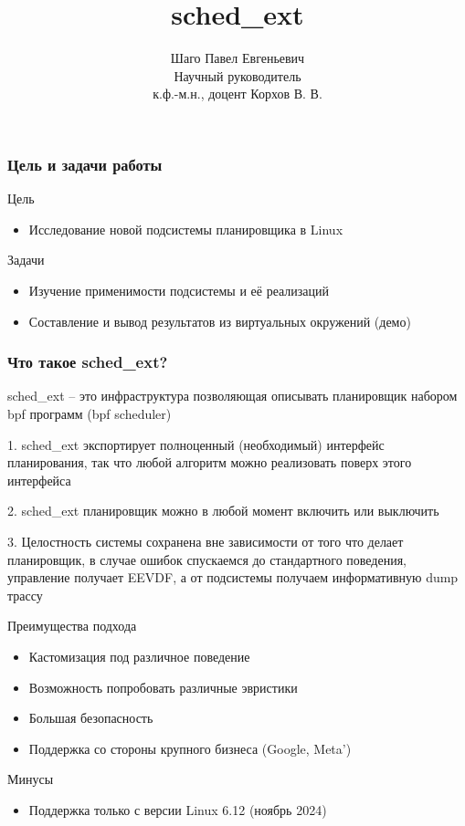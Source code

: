 \documentclass[aspectratio=169]{beamer}
\title{sched\_ext}
\author{Шаго Павел Евгеньевич \\[1\baselineskip] Научный руководитель\\ к.ф.-м.н.,
доцент Корхов В. В.}
\institute{Санкт-Петербургский государственный университет \\ Факультет прикладной математики - процессов управления \\ Кафедра моделирования электромеханических и компьютерных систем}
\begin{document}
\begin{frame}
  \titlepage
\end{frame}

\begin{frame}
  \frametitle{Цель и задачи работы}
  \begin{block}{Цель}
    \begin{itemize}
      \item Исследование новой подсистемы планировщика в Linux
    \end{itemize}
  \end{block}

  \begin{block}{Задачи}
    \begin{itemize}
      \item Изучение применимости подсистемы и её реализаций
      \item Составление и вывод результатов из виртуальных окружений (демо)
    \end{itemize}
  \end{block}

\end{frame}

\begin{frame}
  \frametitle{Что такое sched\_ext?}
  sched\_ext -- это инфраструктура позволяющая описывать
  планировщик набором bpf программ (bpf scheduler)
  
  \vspace*{0.3cm}

  1. sched\_ext экспортирует полноценный (необходимый) интерфейс
  планирования, так что любой алгоритм можно реализовать поверх
  этого интерфейса

  2. sched\_ext планировщик можно в любой момент включить или выключить

  3. Целостность системы сохранена вне зависимости от того что делает
  планировщик, в случае ошибок спускаемся до стандартного поведения,
  управление получает EEVDF, а от подсистемы получаем информативную dump трассу
\end{frame}

\begin{frame}
  Преимущества подхода
  \begin{itemize}
      \item Кастомизация под различное поведение
      \item Возможность попробовать различные эвристики
      \item Большая безопасность
      \item Поддержка со стороны крупного бизнеса (Google, Meta')
  \end{itemize} 
  Минусы
  \begin{itemize}
    \item Поддержка только с версии Linux 6.12 (ноябрь 2024)
  \end{itemize}
\end{frame}
\end{document}
